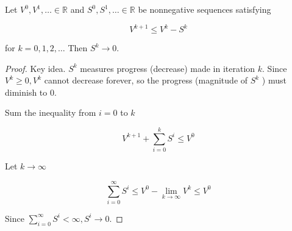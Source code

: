 \begin{theorem}
    Let $V^{0}, V^{1}, \ldots \in \mathbb{R}$ and $S^{0}, S^{1}, \ldots \in \mathbb{R}$ be nonnegative sequences satisfying

    $$
    V^{k+1} \leq V^{k}-S^{k}
    $$

    for $k=0,1,2, \ldots$ Then $S^{k} \rightarrow 0$.

    \begin{proof}
        Key idea. $S^{k}$ measures progress (decrease) made in iteration $k$. Since $V^{k} \geq 0, V^{k}$ cannot decrease forever, so the progress (magnitude of $S^{k}$ ) must diminish to 0.

        Sum the inequality from $i=0$ to $k$

        $$
        V^{k+1}+\sum_{i=0}^{k} S^{i} \leq V^{0}
        $$

        Let $k \rightarrow \infty$

        $$
        \sum_{i=0}^{\infty} S^{i} \leq V^{0}-\lim _{k \rightarrow \infty} V^{k} \leq V^{0}
        $$

        Since $\sum_{i=0}^{\infty} S^{i}<\infty, S^{i} \rightarrow 0$.
    \end{proof}
\end{theorem}

